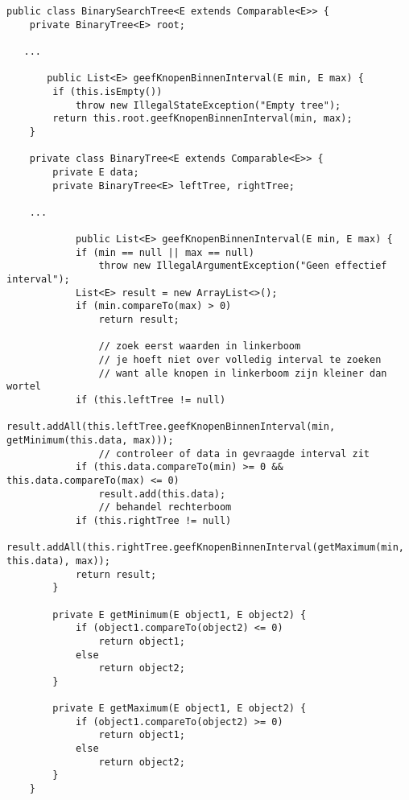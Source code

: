 \begin{oef}
\begin{opl}
\begin{lstlisting}
public class BinarySearchTree<E extends Comparable<E>> {
    private BinaryTree<E> root;

   ...
   
       public List<E> geefKnopenBinnenInterval(E min, E max) {
        if (this.isEmpty())
            throw new IllegalStateException("Empty tree");
        return this.root.geefKnopenBinnenInterval(min, max);
    }

    private class BinaryTree<E extends Comparable<E>> {
        private E data;
        private BinaryTree<E> leftTree, rightTree;

	...
	
	        public List<E> geefKnopenBinnenInterval(E min, E max) {
            if (min == null || max == null)
                throw new IllegalArgumentException("Geen effectief interval");
            List<E> result = new ArrayList<>();
            if (min.compareTo(max) > 0)
                return result;
                
                // zoek eerst waarden in linkerboom
                // je hoeft niet over volledig interval te zoeken 
                // want alle knopen in linkerboom zijn kleiner dan wortel
            if (this.leftTree != null)
                result.addAll(this.leftTree.geefKnopenBinnenInterval(min, getMinimum(this.data, max)));
                // controleer of data in gevraagde interval zit
            if (this.data.compareTo(min) >= 0 && this.data.compareTo(max) <= 0)
                result.add(this.data);
                // behandel rechterboom
            if (this.rightTree != null)
                result.addAll(this.rightTree.geefKnopenBinnenInterval(getMaximum(min, this.data), max));
            return result;
        }

        private E getMinimum(E object1, E object2) {
            if (object1.compareTo(object2) <= 0)
                return object1;
            else
                return object2;
        }

        private E getMaximum(E object1, E object2) {
            if (object1.compareTo(object2) >= 0)
                return object1;
            else
                return object2;
        }
    }
\end{lstlisting}
\end{opl}
\end{oef}


